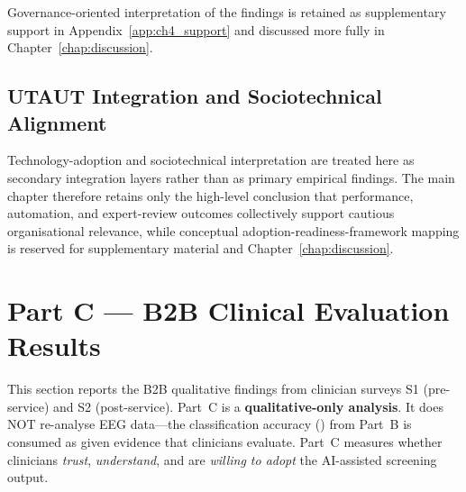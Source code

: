 Governance-oriented interpretation of the findings is retained as supplementary support in Appendix~\ref{app:ch4_support} and discussed more fully in Chapter~\ref{chap:discussion}.


\subsection{UTAUT Integration and Sociotechnical Alignment}

Technology-adoption and sociotechnical interpretation are treated here as secondary integration layers rather than as primary empirical findings. The main chapter therefore retains only the high-level conclusion that performance, automation, and expert-review outcomes collectively support cautious organisational relevance, while conceptual adoption-readiness-framework mapping is reserved for supplementary material and Chapter~\ref{chap:discussion}.

\section{Part C --- B2B Clinical Evaluation Results}
\label{sec:ch4_part_c}

This section reports the B2B qualitative findings from clinician surveys S1 (pre-service) and S2 (post-service). Part~C is a \textbf{qualitative-only analysis}. It does NOT re-analyse EEG data---the classification accuracy (\asdacc{}) from Part~B is consumed as given evidence that clinicians evaluate. Part~C measures whether clinicians \textit{trust}, \textit{understand}, and are \textit{willing to adopt} the AI-assisted screening output.

